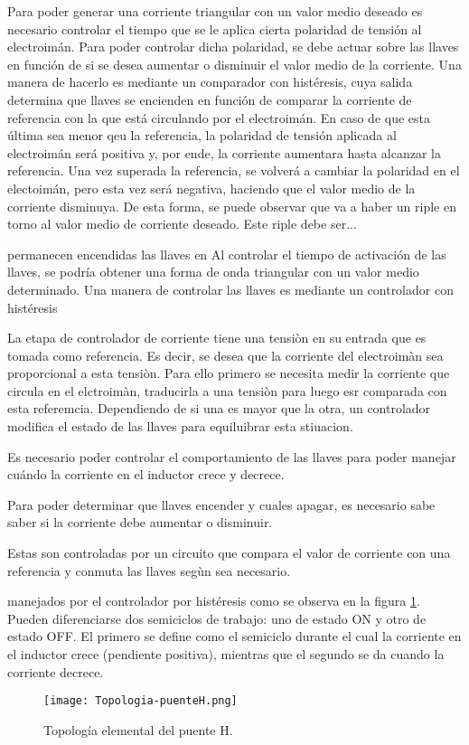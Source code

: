 Para poder generar una corriente triangular con un valor medio deseado es necesario controlar el tiempo que se le aplica cierta polaridad de tensión al electroimán. Para poder controlar dicha polaridad, se debe actuar sobre las llaves en función de si se desea aumentar o disminuir el valor medio de la corriente.  Una manera de hacerlo es mediante un comparador con histéresis, cuya salida determina que llaves se encienden en función de comparar la corriente de referencia con la que está circulando por el electroimán. En caso de que esta última sea menor qeu la referencia, la polaridad de tensión aplicada al electroimán será positiva y, por ende, la corriente aumentara hasta alcanzar la referencia. Una vez superada la referencia, se volverá a cambiar la polaridad en el electoimán, pero esta vez será negativa, haciendo que el valor medio de la corriente disminuya. De esta forma, se puede observar que va a haber un riple en torno al valor medio de corriente deseado.  Este riple debe ser...

permanecen encendidas las llaves en 
Al controlar el tiempo de activación de las llaves, se podría obtener una forma de onda triangular con un valor medio determinado. Una manera de controlar las llaves es mediante un controlador con histéresis

La etapa de controlador de corriente tiene una tensiòn en su entrada que es tomada como referencia. Es decir, se desea que la corriente del electroimàn sea proporcional a esta tensiòn. Para ello primero se necesita medir la corriente que circula en el elctroimàn, traducirla a una tensiòn para luego esr comparada con esta referemcia. Dependiendo de si una es mayor que la otra, un controlador modifica el estado de las llaves para equiluibrar esta stiuacion. 

Es necesario poder controlar el comportamiento de las llaves para poder manejar cuándo la corriente en el inductor crece y decrece. 

Para poder determinar que llaves encender y cuales apagar, es necesario sabe saber si la corriente debe aumentar o disminuir.

Estas son controladas por un circuito que compara el valor de corriente con una referencia y conmuta las llaves segùn sea necesario.

 manejados por el controlador por histéresis como se observa en la figura \ref{fig:img_topologia-puenteH}. Pueden diferenciarse dos semiciclos de trabajo: uno de estado ON y otro de estado OFF. El primero se define como el semiciclo durante el cual la corriente en el inductor crece (pendiente positiva), mientras que el segundo se da cuando la corriente decrece.

\begin{figure}[H]
	\centering
	\texttt{[image: Topologia-puenteH.png]}
	\caption{Topología elemental del puente H.}
	\label{fig:img_topologia-puenteH}
\end{figure}
